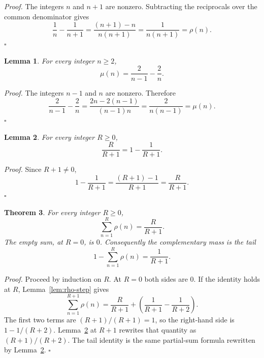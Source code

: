 \documentclass[11pt,letterpaper]{article}
\newtheorem{theorem}{Theorem}
\newtheorem{lemma}[theorem]{Lemma}
\newenvironment{proof}{\noindent\textit{Proof.}}{\hfill\(\square\)}
\begin{document}
\begin{proof}
The integers $n$ and $n+1$ are nonzero. Subtracting the reciprocals over the common denominator gives
\begin{equation*}
\frac{1}{n}-\frac{1}{n+1}
=\frac{(n+1)-n}{n(n+1)}
=\frac{1}{n(n+1)}
=\rho(n).
\end{equation*}
\end{proof}

\begin{lemma}
\label{lem:mu-step}
For every integer $n\ge 2$,
\begin{equation*}
\mu(n)=\frac{2}{n-1}-\frac{2}{n}.
\end{equation*}
\end{lemma}

\begin{proof}
The integers $n-1$ and $n$ are nonzero. Therefore
\begin{equation*}
\frac{2}{n-1}-\frac{2}{n}
=\frac{2n-2(n-1)}{(n-1)n}
=\frac{2}{n(n-1)}
=\mu(n).
\end{equation*}
\end{proof}

\begin{lemma}
\label{lem:rho-closed}
For every integer $R\ge 0$,
\begin{equation*}
\frac{R}{R+1}=1-\frac{1}{R+1}.
\end{equation*}
\end{lemma}

\begin{proof}
Since $R+1\neq 0$,
\begin{equation*}
1-\frac{1}{R+1}=\frac{(R+1)-1}{R+1}=\frac{R}{R+1}.
\end{equation*}
\end{proof}

\begin{theorem}
\label{thm:rho-partial}
For every integer $R\ge 0$,
\begin{equation*}
\sum_{n=1}^{R}\rho(n)=\frac{R}{R+1}.
\end{equation*}
The empty sum, at $R=0$, is $0$. Consequently the complementary mass is the tail
\begin{equation*}
1-\sum_{n=1}^{R}\rho(n)=\frac{1}{R+1}.
\end{equation*}
\end{theorem}

\begin{proof}
Proceed by induction on $R$. At $R=0$ both sides are $0$. If the identity holds at $R$, Lemma~\ref{lem:rho-step} gives
\begin{equation*}
\sum_{n=1}^{R+1}\rho(n)
=\frac{R}{R+1}+\left(\frac{1}{R+1}-\frac{1}{R+2}\right).
\end{equation*}
The first two terms are $(R+1)/(R+1)=1$, so the right-hand side is $1-1/(R+2)$. Lemma~\ref{lem:rho-closed} at $R+1$ rewrites that quantity as $(R+1)/(R+2)$. The tail identity is the same partial-sum formula rewritten by Lemma~\ref{lem:rho-closed}.
\end{proof}
\end{document}
